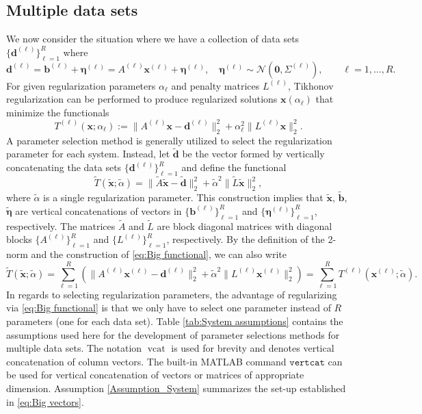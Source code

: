 \documentclass[12pt]{article}
\newcommand{\bVec}{\mathbf{b}}	%
\newcommand{\dVec}{\mathbf{d}}	%
\newcommand{\xVec}{\mathbf{x}}	%
\DeclareMathOperator{\vcat}{vcat}	%
\newcommand{\regparam}{\alpha}  %
\newcommand{\noise}{\eta}	%
\newcommand{\noiseVec}{\bm{\noise}}	%
\begin{document}
\subsection{Multiple data sets}
We now consider the situation where we have a collection of data sets $\{\dVec^{(\ell)}\}_{\ell=1}^R$ where 
\begin{equation}
\label{eq:Big vectors}
\dVec^{(\ell)} = \bVec^{(\ell)} + \noiseVec^{(\ell)} = {A^{(\ell)}}\xVec^{(\ell)} + \noiseVec^{(\ell)}, \quad \noiseVec^{(\ell)} \sim \mathcal{N}(\bm{0},\Sigma^{(\ell)}), \qquad \ell = 1,\ldots,R.
\end{equation}
For given regularization parameters $\regparam_\ell$ and penalty matrices $L^{(\ell)}$, Tikhonov regularization can be performed to produce regularized solutions $\xVec(\regparam_\ell)$ that minimize the functionals
\begin{equation}
T^{(\ell)}(\xVec;\regparam_\ell) := \|A^{(\ell)}\xVec - \dVec^{(\ell)}\|_2^2 + \regparam_\ell^2\|L^{(\ell)}\xVec\|_2^2.
\end{equation}
A parameter selection method is generally utilized to select the regularization parameter for each system. Instead, let $\widetilde{\dVec}$ be the vector formed by vertically concatenating the data sets $\{\dVec^{(\ell)}\}_{\ell=1}^R$ and define the functional
\begin{equation}
\label{eq:Big functional}
\widetilde{T}\left(\widetilde{\xVec};\widetilde{\regparam}\right) = \|\widetilde{A}\widetilde{\xVec} - \widetilde{\dVec}\|_2^2 + \widetilde{\regparam}^2\|\widetilde{L}\widetilde{\xVec}\|_2^2,
\end{equation}
where $\widetilde{\regparam}$ is a single regularization parameter. This construction implies that $\widetilde{\xVec}$, $\widetilde{\bVec}$, $\widetilde{\noiseVec}$ are vertical concatenations of vectors in $\{\bVec^{(\ell)}\}_{\ell=1}^R$ and $\{\noiseVec^{(\ell)}\}_{\ell=1}^R$, respectively. The matrices $\widetilde{A}$ and $\widetilde{L}$ are block diagonal matrices with diagonal blocks $\{A^{(\ell)}\}_{\ell=1}^R$ and $\{L^{(\ell)}\}_{\ell=1}^R$, respectively. By the definition of the 2-norm and the construction of \eqref{eq:Big functional}, we can also write
\begin{equation}
\label{eq:Big functional 2}
\widetilde{T}\left(\widetilde{\xVec};\widetilde{\regparam}\right) = \sum_{\ell = 1}^R \left(\|A^{(\ell)}\xVec^{(\ell)} - \dVec^{(\ell)}\|_2^2 + \widetilde{\regparam}^2\|L^{(\ell)} \xVec^{(\ell)}\|_2^2\right) = \sum_{\ell=1}^R T^{(\ell)}\left(\xVec^{(\ell)};\widetilde{\regparam}\right).
\end{equation}
In regards to selecting regularization parameters, the advantage of regularizing via \eqref{eq:Big functional} is that we only have to select one parameter instead of $R$ parameters (one for each data set). Table \ref{tab:System assumptions} contains the assumptions used here for the development of parameter selections methods for multiple data sets. The notation $\vcat$ is used for brevity and denotes vertical concatenation of column vectors. The built-in MATLAB command $\mathtt{vertcat}$ can be used for vertical concatenation of vectors or matrices of appropriate dimension. Assumption \ref{Assumption_System} summarizes the set-up established in \eqref{eq:Big vectors}.
\end{document}
